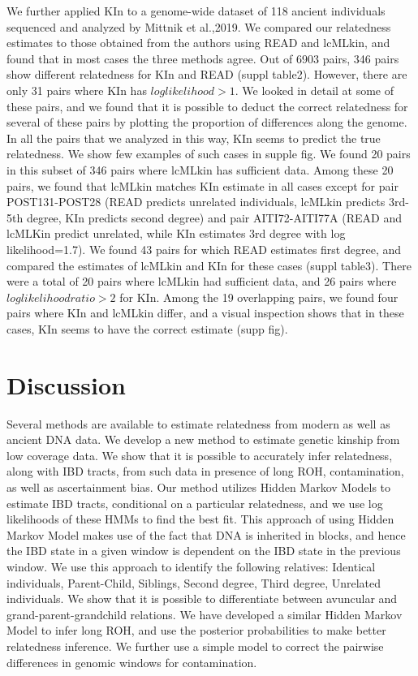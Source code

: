 \documentclass[12pt, letterpaper]{article}
\begin{document}
We further applied KIn to a genome-wide dataset of 118 ancient individuals sequenced and analyzed by Mittnik et al.,2019. We compared our relatedness estimates to those obtained from the authors using READ and lcMLkin, and found that in most cases the three methods agree. Out of 6903 pairs, 346 pairs show different relatedness for KIn and READ (suppl table2). However, there are only 31 pairs where KIn has $log likelihood >1$. We looked in detail at some of these pairs, and we found that it is possible to deduct the correct relatedness for several of these pairs by plotting the proportion of differences along the genome. In all the pairs that we analyzed in this way, KIn seems to predict the true relatedness. We show few examples of such cases in supple fig. We found 20 pairs in this subset of 346 pairs where lcMLkin has sufficient data. Among these 20 pairs, we found that lcMLkin matches KIn estimate in all cases except for pair POST131-POST28 (READ predicts unrelated individuals, lcMLkin predicts 3rd-5th degree, KIn predicts second degree) and pair AITI72-AITI77A (READ and lcMLKin predict unrelated, while KIn estimates 3rd degree with log likelihood=1.7).  
We found 43 pairs for which READ estimates first degree, and compared the estimates of lcMLkin and KIn for these cases (suppl table3). There were a total of 20 pairs where lcMLkin had sufficient data, and 26 pairs where $loglikelihood ratio>2$ for KIn. Among the 19 overlapping pairs, we found four pairs where KIn and lcMLkin differ, and a visual inspection shows that in these cases, KIn seems to have the correct estimate (supp fig).  




\section{Discussion}

Several methods are available to estimate relatedness from modern as well as ancient DNA data. We develop a new method to estimate genetic kinship from low coverage data. We show that it is possible to accurately infer relatedness, along with IBD tracts, from such data in presence of long ROH, contamination, as well as ascertainment bias. Our method utilizes Hidden Markov Models to estimate IBD tracts, conditional on a particular relatedness, and we use log likelihoods of these HMMs to find the best fit. This approach of using Hidden Markov Model makes use of the fact that DNA is inherited in blocks, and hence the IBD state in a given window is dependent on the IBD state in the previous window. We use this approach to identify the following relatives: Identical individuals, Parent-Child, Siblings, Second degree, Third degree, Unrelated individuals. We show that it is possible to differentiate between avuncular and grand-parent-grandchild relations. We have developed a similar Hidden Markov Model to infer long ROH, and use the posterior probabilities to make better relatedness inference. We further use a simple model to correct the pairwise differences in genomic windows for contamination. 
\end{document}
